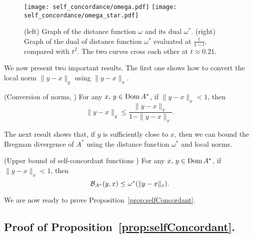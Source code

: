 \begin{subappendices}
\begin{figure}[ht]
	\centering
	\texttt{[image: self\_concordance/omega.pdf]}
	\texttt{[image: self\_concordance/omega\_star.pdf]}
	\caption[Self-concordance proof functions.]{(left) Graph of the distance function $\omega$ and its dual $\omega^*$. (right) Graph of the dual of distance function $\omega^*$ evaluated at $\frac{t}{1-t}$, compared with $t^2$. The two curves cross each other at $t\approx 0.21$.}
	\label{fig:omega}
\end{figure}

We now present two important results. The first one shows how to convert the local norm $\|y-x\|_y$ using $\|y-x\|_x$.
\begin{proposition}\label{prop:conversion_norm}
	(Conversion of norms, \citep[Theorem 4.1.5]{nesterov2003introductory}) For any $x,\,y\in\operatorname{\mathrm{Dom}} A^*$, if $\|y-x\|_x<1$, then
	\[
		\|y-x\|_y \leq \frac{\|y-x\|_x}{1-\|y-x\|_x}.
	\]
\end{proposition}

The next result shows that, if $y$ is sufficiently close to $x$, then we can bound the Bregman divergence of $A^*$ using the distance function $\omega^*$ and local norms.
\begin{proposition}(Upper bound of self-concordant functions \citep[Theorem 4.1.8]{nesterov2003introductory}) \label{prop:upper_bound_self_concordance}
	For any $x,\,y\in\operatorname{\mathrm{Dom}} A^*$, if $\|y-x\|_x<1$, then
	\[
		{\mathcal B}_{A^*}(y,x) \leq \omega^*(\|y-x\|_x).
	\]
\end{proposition}

We are now ready to prove Proposition~\ref{prop:selfConcordant}.


\subsection{Proof of Proposition~\ref{prop:selfConcordant}.}


\end{subappendices}
